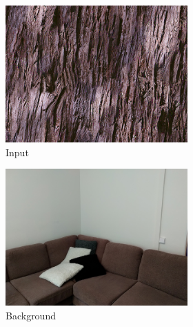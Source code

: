 \begin{figure}[]
    \begin{subfigure}{\textwidth}
        \centering
        \begin{subfigure}{0.24\textwidth}
            \centering
            \includegraphics[width=\textwidth]{images/04-experiment02/sofa/wood/target.jpg}
            \caption*{Input}
        \end{subfigure}
        \hfill
        \begin{subfigure}{0.24\textwidth}
            \centering
            \includegraphics[width=\textwidth]{images/04-experiment02/sofa/bg.jpg}
            \caption*{Background}
        \end{subfigure}
        \hfill
        \begin{subfigure}{0.24\textwidth}

\end{subfigure}
\end{subfigure}
\end{figure}

